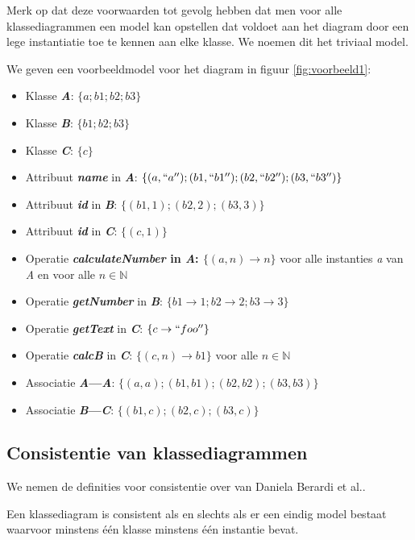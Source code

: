 Merk op dat deze voorwaarden tot gevolg hebben dat men voor alle klassediagrammen een model kan opstellen dat voldoet aan het diagram door een lege instantiatie toe te kennen aan elke klasse. We noemen dit het triviaal model.

We geven een voorbeeldmodel voor het diagram in figuur \ref{fig:voorbeeld1}:

\begin{itemize}
	\item Klasse \textbf{\textit{A}}: $\{a; b1; b2; b3\}$
	\item Klasse \textbf{\textit{B}}: $\{b1; b2; b3\}$
	\item Klasse \textbf{\textit{C}}: $\{c\}$
	\item Attribuut \textbf{\textit{name}} in \textbf{\textit{A}}: $\{(a,``a''); (b1,``b1''); (b2,``b2''); (b3,``b3'')\}$
	\item Attribuut \textbf{\textit{id}} in \textbf{\textit{B}}: $\{(b1,1);(b2,2);(b3,3)\}$
	\item Attribuut \textbf{\textit{id}} in \textbf{\textit{C}}: $\{(c,1)\}$
	\item Operatie \textbf{\textit{calculateNumber} in \textbf{\textit{A}}: $\{(a,n)\rightarrow{}n\}$} voor alle instanties \textit{a} van \textit{A} en voor alle $n \in \mathbb{N}$
	\item Operatie \textbf{\textit{getNumber}} in \textbf{\textit{B}}: $\{b1\rightarrow{}1; b2\rightarrow{}2; b3\rightarrow{}3\}$
	\item Operatie \textbf{\textit{getText}} in \textbf{\textit{C}}: $\{c\rightarrow{}``foo''\}$
	\item Operatie \textbf{\textit{calcB}} in \textbf{\textit{C}}: $\{(c,n)\rightarrow{}b1\}$ voor alle $n \in \mathbb{N}$
	\item Associatie \textbf{\textit{A}---\textit{A}}: $\{(a, a); (b1, b1); (b2, b2); (b3, b3)\}$
	\item Associatie \textbf{\textit{B}---\textit{C}}: $\{(b1,c); (b2,c); (b3,c)\}$
\end{itemize}

\subsection{Consistentie van klassediagrammen}

We nemen de definities voor consistentie over van Daniela Berardi et al.\cite{BerardiDaniela2005RoUc}.

\begin{definition}
Een klassediagram is consistent als en slechts als er een eindig model bestaat waarvoor minstens \'e\'en klasse minstens \'e\'en instantie bevat.
\end{definition}\label{def:diagram-consistency}

